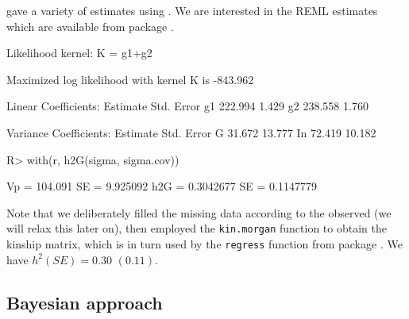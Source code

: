 \documentclass[article]{jss}
\begin{document}
\cite{tempelman04} gave a variety of estimates using  
\citep{SAS-STAT}. We are interested in the REML estimates which are 
available from package  \citep{clifford06}.
%
\begin{Schunk}
\begin{Soutput}
Likelihood kernel: K = g1+g2

Maximized log likelihood with kernel K is  -843.962 

Linear Coefficients:
    Estimate Std. Error
 g1  222.994      1.429
 g2  238.558      1.760

Variance Coefficients:
    Estimate Std. Error
 G    31.672     13.777
 In   72.419     10.182
\end{Soutput}
\begin{Sinput}
R> with(r, h2G(sigma, sigma.cov))
\end{Sinput}
\begin{Soutput}
Vp = 104.091 SE = 9.925092 
h2G = 0.3042677 SE = 0.1147779 
\end{Soutput}
\end{Schunk}
%
Note that we deliberately filled the missing data according to the 
observed (we will relax this later on), then employed the 
\verb/kin.morgan/ function to obtain the kinship matrix, which is in 
turn used by the \verb/regress/ function from package .
We have $h^2()=0.30$ $(0.11)$.

\subsection{Bayesian approach}\label{bayes}
\end{document}
